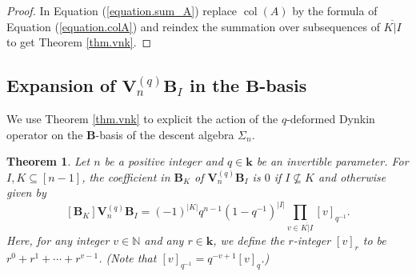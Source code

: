 \documentclass[revision]{FPSAC2025}
\newtheorem{theorem}{Theorem}
\newcommand{\NN}{\mathbb{N}} %
\newcommand{\kk}{\mathbf{k}} %
\newcommand{\col}{\operatorname{col}}
\begin{document}
\begin{proof}
\noindent In Equation (\ref{equation.sum_A}) replace $\col(A)$ by the formula of Equation (\ref{equation.colA}) and reindex the summation over subsequences of $\overline{ K|I}$ to get Theorem \ref{thm.vnk}. 
\end{proof}

\subsection{Expansion of $\mathbf{V}_{n}^{(q)}\mathbf{B}_I$ in the $\mathbf{B}$-basis}

We use Theorem \ref{thm.vnk} to explicit the action of the $q$-deformed Dynkin operator on the $\mathbf{B}$-basis of the descent algebra $\Sigma_n$. 


\begin{theorem}
\label{thm.vnq}
Let $n$ be a positive integer and $q \in \mathbf{k}$ be an invertible parameter.
For $I, K \subseteq [n-1]$, the coefficient in $\mathbf{B}_K$ of $\mathbf{V}^{(q)}_n\mathbf{B}_I$ is $0$ if $I \nsubseteq K$ and otherwise given by
\begin{equation}
\label{equation.thm.vnq}
[\mathbf{B}_K]\mathbf{V}^{(q)}_n\mathbf{B}_I
= (-1)^{|K|} q^{n-1} (1-q^{-1})^{|I|} \prod_{v \in \overline{ K|I}}[v]_{q^{-1}}.
\end{equation}
Here, for any integer $v \in \NN$ and any $r \in \kk$, we define the $r$-integer $[v]_r$ to be $r^0 + r^1 + \cdots + r^{v-1}$. (Note that $[v]_{q^{-1}} = q^{-v+1} [v]_q$.)
\end{theorem}
\end{document}
